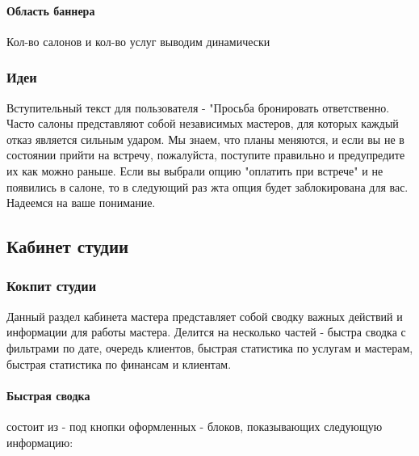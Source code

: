 \documentclass[DIV=calc, paper=a4, fontsize=11pt]{scrartcl} %
\begin{document}
\paragraph{Область баннера}
Кол-во салонов и кол-во услуг выводим динамически

\subsubsection{Идеи}

Вступительный текст для пользователя - "Просьба бронировать ответственно. Часто салоны представляют собой независимых мастеров, для которых каждый отказ является сильным ударом. Мы знаем, что планы меняются, и если вы не в состоянии прийти на встречу, пожалуйста, поступите правильно и предупредите их как можно раньше. Если вы выбрали опцию "оплатить при встрече" и не появились в салоне, то в следующий раз жта опция будет заблокирована для вас. Надеемся на ваше понимание.

\subsection{Кабинет студии}

\subsubsection{Кокпит студии}
Данный раздел кабинета мастера представляет собой сводку важных действий и информации для работы мастера. Делится на несколько частей - быстра сводка с фильтрами по дате, очередь клиентов, быстрая статистика по услугам и мастерам, быстрая статистика по финансам и клиентам.

\paragraph{Быстрая сводка} 
состоит из - под кнопки оформленных - блоков, показывающих следующую информацию:
\end{document}
